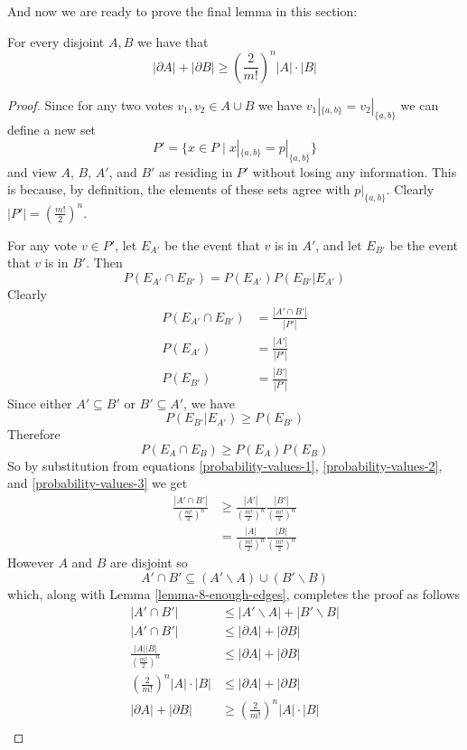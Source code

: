 	And now we are ready to prove the final lemma in this section:

	\begin{lemma}
		\label{friedgut-lemma-8}
		For every disjoint $A, B$ we have that
		\[
			|\partial A| + |\partial B| \ge \left( \frac{2}{m!} \right)^n |A| \cdot |B|
		\]
	\end{lemma}

	\begin{proof}
		Since for any two votes $v_1, v_2 \in A \cup B$ we have $v_1|_{\{a,b\}} = v_2|_{\{a,b\}}$ we can define a new set
		\[
			P' = \{x \in P \mid x|_{\{a,b\}} = p|_{\{a,b\}}\}
		\]
		and view $A$, $B$, $A'$, and $B'$ as residing in $P'$ without losing any information. This is because, by definition, the elements of these sets agree with $p|_{\{a,b\}}$. Clearly $|P'| = (\frac{m!}{2})^n$.

		For any vote $v \in P'$, let $E_{A'}$ be the event that $v$ is in $A'$, and let $E_{B'}$ be the event that $v$ is in $B'$. Then
		\[
			P(E_{A'} \cap E_{B'}) = P(E_{A'}) P(E_{B'}|E_{A'})
		\]
		Clearly
		\begin{align}
			\label{probability-values-1}
			P(E_{A'} \cap E_{B'}) &= \frac{|A' \cap B'|}{|P'|} \\
			\label{probability-values-2}
			P(E_{A'}) &= \frac{|A'|}{|P'|} \\
			\label{probability-values-3}
			P(E_{B'}) &= \frac{|B'|}{|P'|}
		\end{align}
		Since either $A' \subseteq B'$ or $B' \subseteq A'$, we have
		\[
			P(E_{B'}|E_{A'}) \ge P(E_{B'})
		\]
		Therefore
		\[
			P(E_A \cap E_B) \ge P(E_A) P(E_B)
		\]
		So by substitution from equations \ref{probability-values-1}, \ref{probability-values-2}, and \ref{probability-values-3} we get
		\begin{align*}
			\frac{|A' \cap B'|}{(\frac{m!}{2})^n} &\ge \frac{|A'|}{(\frac{m!}{2})^n} \frac{|B'|}{(\frac{m!}{2})^n} \\
			&= \frac{|A|}{(\frac{m!}{2})^n} \frac{|B|}{(\frac{m!}{2})^n}
		\end{align*}
		However $A$ and $B$ are disjoint so
		\[
			A' \cap B' \subseteq (A' \backslash A) \cup (B' \backslash B)
		\]
		which, along with Lemma \ref{lemma-8-enough-edges}, completes the proof as follows
		\begin{align*}
			|A' \cap B'| &\le |A' \backslash A| + |B' \backslash B| \\
			|A' \cap B'| &\le |\partial A| + |\partial B| \\
			\frac{|A||B|}{(\frac{m!}{2})^n} &\le |\partial A| + |\partial B| \\
			\left(\frac{2}{m!}\right)^n |A| \cdot |B| &\le |\partial A| + |\partial B| \\
			|\partial A| + |\partial B| &\ge \left(\frac{2}{m!}\right)^n |A| \cdot |B| \\
		\end{align*}
	\end{proof}

